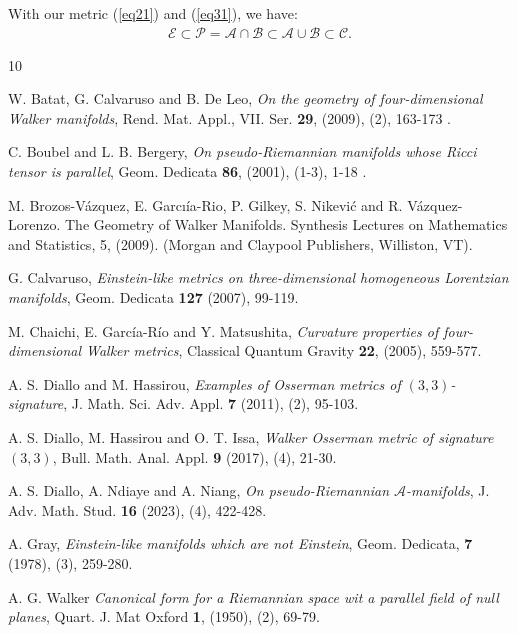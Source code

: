 \documentclass[reqno, 12pt]{amsart}
\numberwithin{equation}{section}
\begin{document}
With our metric (\ref{eq21}) and (\ref{eq31}), we have:
\begin{eqnarray*}
\mathcal{E} \subset \mathcal{P} = \mathcal{A} \cap \mathcal{B} \subset\mathcal{A} \cup \mathcal{B}\subset\mathcal{C}.
\end{eqnarray*}





  


\begin{thebibliography}{10}

W. Batat, G. Calvaruso and B. De Leo,
\emph{On the geometry of four-dimensional Walker manifolds},
Rend. Mat. Appl., VII. Ser. {\bf 29}, (2009), (2), 163-173 . 

C. Boubel and L. B. Bergery, 
\emph{On pseudo-Riemannian manifolds whose Ricci tensor is parallel}, 
Geom. Dedicata {\bf 86}, (2001), (1-3), 1-18 . 

M. Brozos-V\'azquez, E. Garcı\'ia-Rio, P. Gilkey, S. Nikevi\'c and 
R. V\'azquez-Lorenzo. The Geometry of Walker Manifolds. Synthesis Lectures on Mathematics and Statistics, 5, (2009). (Morgan and Claypool Publishers, Williston, VT).

G. Calvaruso,
\emph{Einstein-like metrics on three-dimensional homogeneous 
Lorentzian manifolds}, 
Geom. Dedicata {\bf 127} (2007), 99-119.

M. Chaichi, E. Garc\'ia-R\'io and Y. Matsushita, 
\emph{Curvature properties of four-dimensional Walker metrics}, 
Classical Quantum Gravity {\bf 22}, (2005), 559-577.

A. S. Diallo and M. Hassirou, 
\emph{Examples of Osserman metrics of $(3,3)$-signature}, 
J. Math. Sci. Adv. Appl. {\bf 7} (2011), (2), 95-103.

A. S. Diallo, M. Hassirou and O. T. Issa, 
\emph{Walker Osserman metric of signature $(3, 3)$},
Bull. Math. Anal. Appl. {\bf 9} (2017), (4), 21-30.

A. S. Diallo, A. Ndiaye and A. Niang,
\emph{On pseudo-Riemannian $\mathcal{A}$-manifolds},  
J. Adv. Math. Stud. {\bf 16} (2023), (4), 422-428.

A. Gray, 
\emph{Einstein-like manifolds which are not Einstein}, 
Geom. Dedicata, {\bf 7} (1978), (3), 259-280.


A. G. Walker
\emph{Canonical form for a Riemannian space wit a parallel field
of null planes},
Quart. J. Mat Oxford {\bf 1}, (1950), (2), 69-79.

\end{thebibliography}
\end{document}
